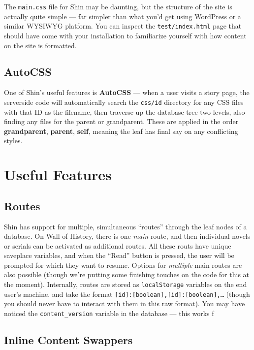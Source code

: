 \documentclass[11pt]{article} %
\begin{document}
The \texttt{main.css} file for Shin may be daunting, but the structure of the site is actually quite simple — far simpler than what you’d get using WordPress or a similar WYSIWYG platform. You can inspect the \texttt{test/index.html} page that should have come with your installation to familiarize yourself with how content on the site is formatted.

\subsection{AutoCSS}

One of Shin’s useful features is \textbf{AutoCSS} — when a user visits a story page, the serverside code will automatically search the \texttt{css/id} directory for any CSS files with that ID as the filename, then traverse up the database tree two levels, also finding any files for the parent or grandparent. These are applied in the order \textbf{grandparent}, \textbf{parent}, \textbf{self}, meaning the leaf has final say on any conflicting styles.

\section{Useful Features}

\subsection{Routes}

Shin has support for multiple, simultaneous “routes” through the leaf nodes of a database. On Wall of History, there is one \textit{main} route, and then individual novels or serials can be activated as additional routes. All these routs have unique saveplace variables, and when the “Read” button is pressed, the user will be prompted for which they want to resume. Options for \textit{multiple} main routes are also possible (though we’re putting some finishing touches on the code for this at the moment). Internally, routes are stored as \texttt{localStorage} variables on the end user’s machine, and take the format \texttt{[id]:[boolean],[id]:[boolean],…} (though you should never have to interact with them in this raw format).
You may have noticed the \texttt{content\_version} variable in the database — this works f

\subsection{Inline Content Swappers}
\end{document}
